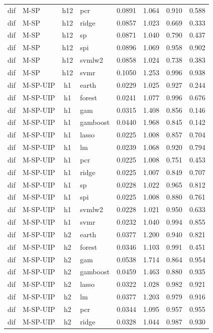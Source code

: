 \begin{ThreePartTable}
\begin{longtable}[t]{llclcccc}
dif & M-SP & h12 & pcr & 0.0891 & 1.064 & 0.910 & 0.588\\
dif & M-SP & h12 & ridge & 0.0857 & 1.023 & 0.669 & 0.333\\
dif & M-SP & h12 & sp & 0.0871 & 1.040 & 0.790 & 0.437\\
dif & M-SP & h12 & spi & 0.0896 & 1.069 & 0.958 & 0.902\\
dif & M-SP & h12 & svmlw2 & 0.0858 & 1.024 & 0.738 & 0.383\\
dif & M-SP & h12 & svmr & 0.1050 & 1.253 & 0.996 & 0.938\\
\addlinespace
dif & M-SP-UIP & h1 & earth & 0.0229 & 1.025 & 0.927 & 0.244\\
dif & M-SP-UIP & h1 & forest & 0.0241 & 1.077 & 0.996 & 0.676\\
dif & M-SP-UIP & h1 & gam & 0.0315 & 1.408 & 0.856 & 0.146\\
dif & M-SP-UIP & h1 & gamboost & 0.0440 & 1.968 & 0.845 & 0.142\\
dif & M-SP-UIP & h1 & lasso & 0.0225 & 1.008 & 0.857 & 0.704\\
dif & M-SP-UIP & h1 & lm & 0.0239 & 1.068 & 0.920 & 0.794\\
dif & M-SP-UIP & h1 & pcr & 0.0225 & 1.008 & 0.751 & 0.453\\
dif & M-SP-UIP & h1 & ridge & 0.0225 & 1.007 & 0.849 & 0.707\\
dif & M-SP-UIP & h1 & sp & 0.0228 & 1.022 & 0.965 & 0.812\\
dif & M-SP-UIP & h1 & spi & 0.0225 & 1.008 & 0.880 & 0.761\\
dif & M-SP-UIP & h1 & svmlw2 & 0.0228 & 1.021 & 0.950 & 0.633\\
dif & M-SP-UIP & h1 & svmr & 0.0232 & 1.040 & 0.994 & 0.855\\
\addlinespace
dif & M-SP-UIP & h2 & earth & 0.0377 & 1.200 & 0.940 & 0.821\\
dif & M-SP-UIP & h2 & forest & 0.0346 & 1.103 & 0.991 & 0.451\\
dif & M-SP-UIP & h2 & gam & 0.0538 & 1.714 & 0.864 & 0.954\\
dif & M-SP-UIP & h2 & gamboost & 0.0459 & 1.463 & 0.880 & 0.935\\
dif & M-SP-UIP & h2 & lasso & 0.0322 & 1.028 & 0.982 & 0.921\\
dif & M-SP-UIP & h2 & lm & 0.0377 & 1.203 & 0.979 & 0.916\\
dif & M-SP-UIP & h2 & pcr & 0.0344 & 1.095 & 0.957 & 0.955\\
dif & M-SP-UIP & h2 & ridge & 0.0328 & 1.044 & 0.987 & 0.930\\

\end{longtable}
\end{ThreePartTable}
